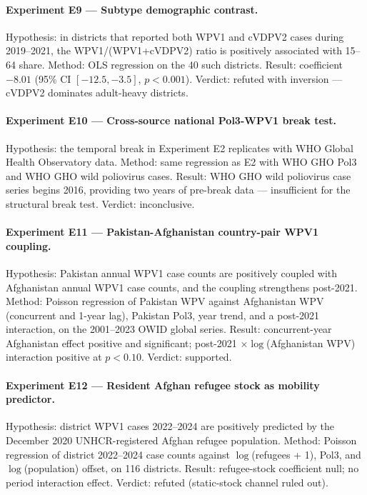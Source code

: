 \documentclass[11pt]{article}
\begin{document}
\paragraph{Experiment E9 --- Subtype demographic contrast.} Hypothesis: in districts that reported both WPV1 and cVDPV2 cases during 2019--2021, the WPV1/(WPV1+cVDPV2) ratio is positively associated with 15--64 share. Method: OLS regression on the 40 such districts. Result: coefficient $-8.01$ (95\% CI $[-12.5, -3.5]$, $p<0.001$). Verdict: refuted with inversion --- cVDPV2 dominates adult-heavy districts.

\paragraph{Experiment E10 --- Cross-source national Pol3-WPV1 break test.} Hypothesis: the temporal break in Experiment E2 replicates with WHO Global Health Observatory data. Method: same regression as E2 with WHO GHO Pol3 and WHO GHO wild poliovirus cases. Result: WHO GHO wild poliovirus case series begins 2016, providing two years of pre-break data --- insufficient for the structural break test. Verdict: inconclusive.

\paragraph{Experiment E11 --- Pakistan-Afghanistan country-pair WPV1 coupling.} Hypothesis: Pakistan annual WPV1 case counts are positively coupled with Afghanistan annual WPV1 case counts, and the coupling strengthens post-2021. Method: Poisson regression of Pakistan WPV against Afghanistan WPV (concurrent and 1-year lag), Pakistan Pol3, year trend, and a post-2021 interaction, on the 2001--2023 OWID global series. Result: concurrent-year Afghanistan effect positive and significant; post-2021 $\times \log$(Afghanistan WPV) interaction positive at $p<0.10$. Verdict: supported.

\paragraph{Experiment E12 --- Resident Afghan refugee stock as mobility predictor.} Hypothesis: district WPV1 cases 2022--2024 are positively predicted by the December 2020 UNHCR-registered Afghan refugee population. Method: Poisson regression of district 2022--2024 case counts against $\log$(refugees + 1), Pol3, and $\log$(population) offset, on 116 districts. Result: refugee-stock coefficient null; no period interaction effect. Verdict: refuted (static-stock channel ruled out).
\end{document}
